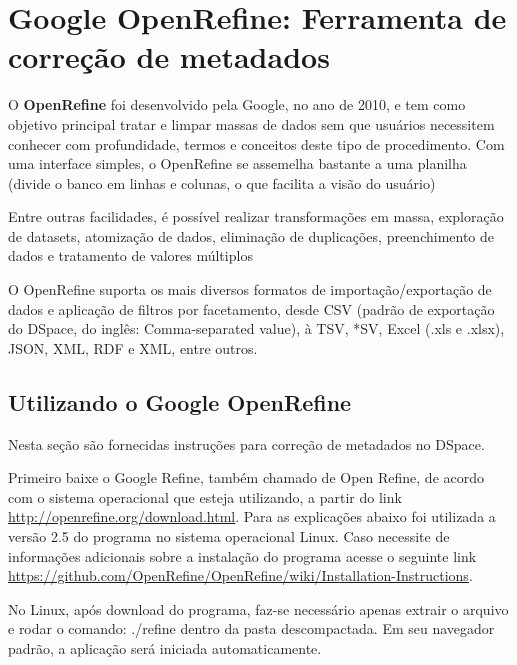 \documentclass[12pt,hidelinks]{article}
\begin{document}
\newpage

\section{Google OpenRefine: Ferramenta de correção de metadados}

\newpage
    
    O \textbf{OpenRefine} foi desenvolvido pela Google, no ano de 2010, e tem como objetivo principal tratar e limpar massas de dados sem que usuários necessitem conhecer com profundidade, termos e conceitos deste tipo de procedimento. Com uma interface simples, o OpenRefine se assemelha bastante a uma planilha (divide o banco em linhas e colunas, o que facilita a visão do usuário)
    
    \singlespacing
    
    Entre outras facilidades, é possível realizar transformações em massa, exploração de datasets, atomização de dados, eliminação de duplicações, preenchimento de dados e tratamento de valores múltiplos
    
    \singlespacing
    
    O OpenRefine suporta os mais diversos formatos de importação/exportação de dados e aplicação de filtros por facetamento, desde CSV (padrão de exportação do DSpace, do inglês: Comma-separated value), à TSV, *SV, Excel (.xls e .xlsx), JSON, XML, RDF e XML, entre outros.
    
    \subsection{Utilizando o Google OpenRefine}
    
    Nesta seção são fornecidas instruções para correção de metadados no DSpace. 
    
    \singlespacing
    
    Primeiro baixe o Google Refine, também chamado de Open Refine, de acordo com o sistema operacional que esteja utilizando, a partir do link \url{http://openrefine.org/download.html}.
    Para as explicações abaixo foi utilizada a versão 2.5 do programa no sistema operacional Linux. Caso necessite de informações adicionais sobre a instalação do programa acesse o seguinte link
    \url{https://github.com/OpenRefine/OpenRefine/wiki/Installation-Instructions}.
    
    \singlespacing
    
    No Linux, após download do programa, faz-se necessário apenas extrair o arquivo e rodar o comando: ./refine dentro da pasta descompactada. Em seu navegador padrão, a aplicação será iniciada automaticamente.
    
\end{document}

